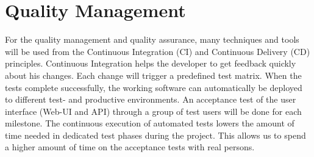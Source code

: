 \section{Quality Management}

For the quality management and quality assurance, many techniques and tools
will be used from the Continuous Integration (CI) and Continuous Delivery (CD)
principles. Continuous Integration helps the developer to get feedback quickly
about his changes. Each change will trigger a predefined test matrix. When the
tests complete successfully, the working software can automatically be deployed
to different test- and productive environments. An acceptance test of the user
interface (Web-UI and API) through a group of test users will be done for each
milestone. The continuous execution of automated tests lowers the amount of
time needed in dedicated test phases during the project. This allows us to
spend a higher amount of time on the acceptance tests with real persons.

